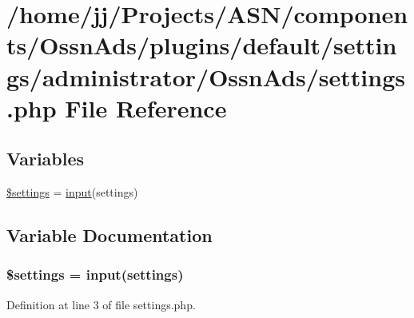 \hypertarget{components_2_ossn_ads_2plugins_2default_2settings_2administrator_2_ossn_ads_2settings_8php}{}\section{/home/jj/\+Projects/\+A\+S\+N/components/\+Ossn\+Ads/plugins/default/settings/administrator/\+Ossn\+Ads/settings.php File Reference}
\label{components_2_ossn_ads_2plugins_2default_2settings_2administrator_2_ossn_ads_2settings_8php}
\subsection*{Variables}
\begin{DoxyCompactItemize}
\item 
\hyperlink{components_2_ossn_ads_2plugins_2default_2settings_2administrator_2_ossn_ads_2settings_8php_ac7c3353107070daa85f641882931b358}{\$settings} = \hyperlink{ossn_8lib_8input_8php_a64ebee98b041c4f75f71ed3cd73cc8ed}{input}(\textquotesingle{}settings\textquotesingle{})
\end{DoxyCompactItemize}


\subsection{Variable Documentation}
\subsubsection[{\texorpdfstring{\$settings}{$settings}}]{\setlength{\rightskip}{0pt plus 5cm}\$settings = {\bf input}(\textquotesingle{}settings\textquotesingle{})}\hypertarget{components_2_ossn_ads_2plugins_2default_2settings_2administrator_2_ossn_ads_2settings_8php_ac7c3353107070daa85f641882931b358}{}\label{components_2_ossn_ads_2plugins_2default_2settings_2administrator_2_ossn_ads_2settings_8php_ac7c3353107070daa85f641882931b358}


Definition at line 3 of file settings.\+php.

